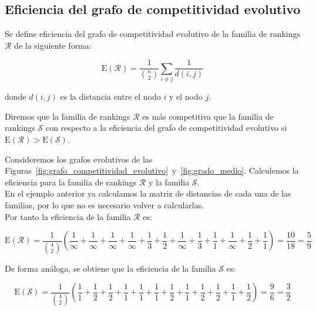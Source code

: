 \subsection*{Eficiencia del grafo de competitividad evolutivo}

\begin{defi}
Se define eficiencia del grafo de competitividad evolutivo de la familia de rankings $\mathcal{R}$ de la siguiente forma:

\begin{equation}
\mathrm{E}(\mathcal{R}) = \dfrac{1}{\binom{n}{2}} \sum_{i\neq j} \dfrac{1}{d(i,j)}
\end{equation}

donde $d(i,j)$ es la distancia entre el nodo $i$ y el nodo $j$.
\end{defi}

\begin{defi}
Diremos que la familia de rankings $\mathcal{R}$ es más competitiva que la familia de rankings $\mathcal{S}$ con respecto a la eficiencia del grafo de competitividad evolutivo si $\mathrm{E}(\mathcal{R}) > \mathrm{E}(\mathcal{S})$.
\end{defi}

\begin{ejemplo}
Consideremos los grafos evolutivos de las Figuras~\ref{fig:grafo_competitividad_evolutivo}~y~\ref{fig:grado_medio}. Calculemos la eficiencia para la familia de rankings $\mathcal{R}$ y la familia $\mathcal{S}$.\\

En el ejemplo anterior ya calculamos la matriz de distancias de cada una de las familias, por lo que no es necesario volver a calcularlas.\\

Por tanto la eficiencia de la familia $\mathcal{R}$ es:

\begin{equation*}
\mathrm{E}(\mathcal{R}) = \dfrac{1}{\binom{4}{2}} \left( \dfrac{1}{\infty} + \dfrac{1}{\infty} + \dfrac{1}{\infty} + \dfrac{1}{\infty} + \dfrac{1}{3} + \dfrac{1}{2} + \dfrac{1}{\infty} + \dfrac{1}{3} + \dfrac{1}{1} + \dfrac{1}{\infty} + \dfrac{1}{2} + \dfrac{1}{1}\right) = \dfrac{10}{18} = \dfrac{5}{9}  
\end{equation*}

De forma análoga, se obtiene que la eficiencia de la familia $\mathcal{S}$ es:

\begin{equation*}
\mathrm{E}(\mathcal{S}) = \dfrac{1}{\binom{4}{2}} \left( \dfrac{1}{1} + \dfrac{1}{2} + \dfrac{1}{2} + \dfrac{1}{1} + \dfrac{1}{1} + \dfrac{1}{1} + \dfrac{1}{2} + \dfrac{1}{1} + \dfrac{1}{2} + \dfrac{1}{2} + \dfrac{1}{1} + \dfrac{1}{2}\right) = \dfrac{9}{6} = \dfrac{3}{2} 
\end{equation*}

\end{ejemplo}

